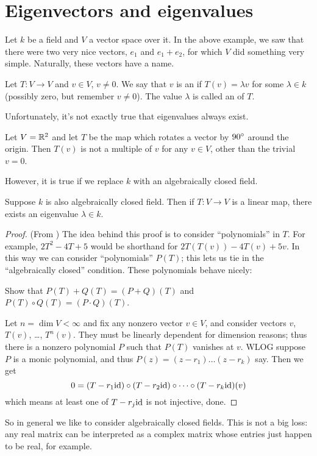 \section{Eigenvectors and eigenvalues}
Let $k$ be a field and $V$ a vector space over it.
In the above example, we saw that there were two very nice
vectors, $e_1$ and $e_1+e_2$, for which $V$ did something very simple.
Naturally, these vectors have a name.
\begin{definition}
	Let $T : V \to V$ and $v \in V$, $v \neq 0$.
	We say that $v$ is an  if $T(v) = \lambda v$
	for some $\lambda \in k$ (possibly zero, but remember $v \neq 0$).
	The value $\lambda$ is called an  of $T$.
\end{definition}

Unfortunately, it's not exactly true that eigenvalues always exist.
\begin{example}
	Let $V = \mathbb R^2$ and let $T$ be the map which rotates a vector by $90^\circ$
	around the origin.
	Then $T(v)$ is not a multiple of $v$ for any $v \in V$, other than the trivial $v=0$.
\end{example}

However, it is true if we replace $k$ with an algebraically closed field.
\begin{theorem}
	Suppose $k$ is also algebraically closed field.
	Then if $T : V \to V$ is a linear map,
	there exists an eigenvalue $\lambda \in k$.
\end{theorem}
\begin{proof}
	(From \cite{ref:axler})
	The idea behind this proof is to consider ``polynomials'' in $T$.
	For example, $2T^2-4T+5$ would be shorthand for $2T(T(v)) - 4T(v) + 5v$.
	In this way we can consider ``polynomials'' $P(T)$;
	this lets us tie in the ``algebraically closed'' condition.
	These polynomials behave nicely:
	\begin{ques}
		Show that $P(T)+Q(T) = (P+Q)(T)$ and $P(T) \circ Q(T) = (P \cdot Q)(T)$.
	\end{ques}

	Let $n = \dim V < \infty$ and fix any nonzero vector $v \in V$,
	and consider vectors $v$, $T(v)$, \dots, $T^n (v)$.
	They must be linearly dependent for dimension reasons;
	thus there is a nonzero polynomial $P$ such that $P(T)$ vanishes at $v$.
	WLOG suppose $P$ is a monic polynomial,
	and thus $P(z) = (z-r_1)\dots(z-r_k)$ say.
	Then we get
	\[ 0 = (T - r_1 \mathrm{id}) \circ (T - r_2 \mathrm{id}) \circ \dots
		\circ (T - r_k \mathrm{id})(v) \]
	which means at least one of $T - r_j \mathrm{id}$ is not injective, done.
\end{proof}
So in general we like to consider algebraically closed fields.
This is not a big loss: any real matrix can be interpreted as a complex matrix
whose entries just happen to be real, for example.

